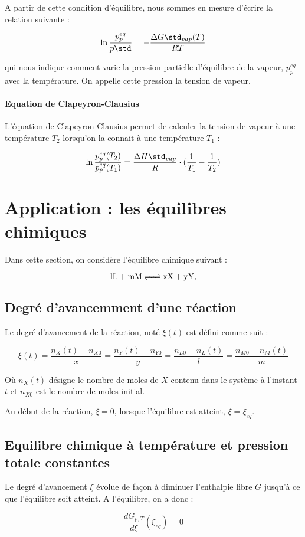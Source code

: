 A partir de cette condition d'équilibre, nous sommes en mesure d'écrire
la relation suivante :

$$\ln \frac{p_p^{eq}}{p\std} = -\frac{\Delta G\std_{vap}(T)}{RT}$$

qui nous indique comment varie la pression partielle d'équilibre de la
vapeur, $p_p^{eq}$ avec la température. On appelle cette pression la tension
de vapeur.

\paragraph{Equation de Clapeyron-Clausius}
L'équation de Clapeyron-Clausius permet de calculer la tension de vapeur à
une température $T_2$ lorsqu'on la connait à une température $T_1$ :

$$\ln \frac{p_p^{eq}(T_2)}{p_p^{eq}(T_1)} = \frac{\Delta H\std_{vap}}{R} \cdot
(\frac{1}{T_1} - \frac{1}{T_2})$$

\section{Application : les équilibres chimiques}
Dans cette section, on considère l'équilibre chimique suivant :

$$\ce{lL + mM <=> xX + yY},$$

\subsection{Degré d'avancemment d'une réaction}
Le degré d'avancement de la réaction, noté $\xi(t)$ est défini comme suit :

$$\xi(t) = \frac{n_X(t)-n_{X0}}{x} = \frac{n_Y(t)-n_{Y0}}{y} = 
\frac{n_{L0} - n_L(t)}{l} = \frac{n_{M0} - n_M(t)}{m}$$

Où $n_X(t)$ désigne le nombre de moles de $X$ contenu dans le système à l'instant
$t$ et $n_{X0}$ est le nombre de moles initial.

Au début de la réaction, $\xi = 0$, lorsque l'équilibre est atteint, 
$\xi = \xi_{eq}$.

\subsection{Equilibre chimique à température et pression totale constantes}
Le degré d'avancement $\xi$ évolue de façon à diminuer l'enthalpie libre $G$
jusqu'à ce que l'équilibre soit atteint. A l'équilibre, on a donc :

$$\frac{dG_{p, T}}{d\xi}(\xi_{eq}) = 0$$

